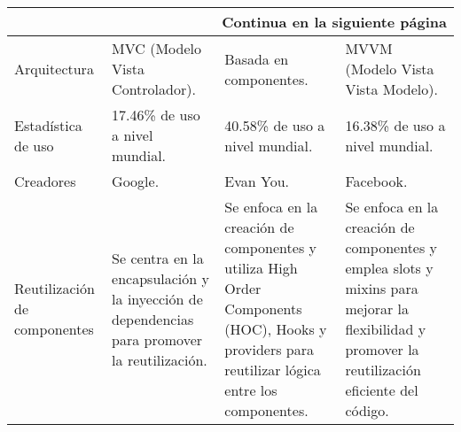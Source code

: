 \begin{longtable}{|p{2.5cm}|p{3cm}|p{3cm}|p{3cm}|}
    \hline \multicolumn{4}{|r|}{{Continua en la siguiente página}}                                                                                                                                                                                                                                                                                                                                                                                                                                                                                                     \\ \hline
    \endfoot

    \hline \hline
    \endlastfoot
    Arquitectura                                   & MVC (Modelo Vista Controlador).                                                                                                                                                                 & Basada en componentes.                                                                                                                                         & MVVM (Modelo Vista Vista Modelo).                                                                                                              \\\hline
    Estadística de uso                             & 17.46\% de uso a nivel mundial.                                                                                                                                                                 & 40.58\% de uso a nivel mundial.                                                                                                                                & 16.38\% de uso a nivel mundial.                                                                                                                \\\hline
    Creadores                                      & Google.                                                                                                                                                                                         & Evan You.                                                                                                                                                      & Facebook.                                                                                                                                      \\\hline
    Reutilización de componentes                   & Se centra en la encapsulación y la inyección de dependencias para promover la reutilización.                                                                                                    & Se enfoca en la creación de componentes y utiliza High Order Components (HOC), Hooks y providers para reutilizar lógica entre los componentes.                 & Se enfoca en la creación de componentes y emplea slots y mixins para mejorar la flexibilidad y promover la reutilización eficiente del código. \\\hline

\end{longtable}
